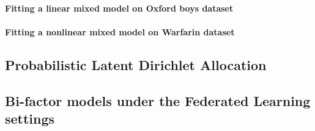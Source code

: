 \documentclass[11pt]{article}
\theoremstyle{t}
\begin{document}
\paragraph{Fitting a linear mixed model on Oxford boys dataset \citep{pinheiro2006mixed}}

\paragraph{Fitting a nonlinear mixed model on Warfarin dataset \citep{international2009estimation}}


\subsection{Probabilistic Latent Dirichlet Allocation}



\subsection{Bi-factor models under the Federated Learning settings}

\newpage






\end{document}
